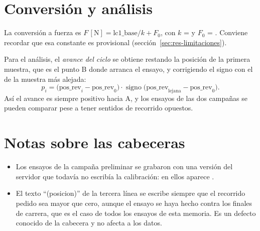 \section{Conversión y análisis}

La conversión a fuerza es $F\,[\si{\newton}] = \text{lc1\_base}/k + F_0$, con $k$ =
 y $F_0$ = . Conviene recordar que esa constante
es provisional (sección~\ref{sec:res-limitaciones}).

Para el análisis, el \emph{avance del ciclo} se obtiene restando la posición de la primera muestra,
que es el punto B donde arranca el ensayo, y corrigiendo el signo con el de la muestra más alejada:
\begin{equation}
  p_i = \big(\text{pos\_rev}_i - \text{pos\_rev}_0\big)\cdot\operatorname{signo}
        \big(\text{pos\_rev}_{\text{lejana}} - \text{pos\_rev}_0\big).
\end{equation}
Así el avance es siempre positivo hacia A, y los ensayos de las dos campañas se pueden comparar pese
a tener sentidos de recorrido opuestos.

\section{Notas sobre las cabeceras}

\begin{itemize}
  \item Los ensayos de la campaña preliminar se grabaron con una versión del servidor que todavía no
        escribía la calibración: en ellos aparece .
  \item El texto ``(posicion)'' de la tercera línea se escribe siempre que el recorrido pedido sea
        mayor que cero, aunque el ensayo se haya hecho contra los finales de carrera, que es el caso
        de todos los ensayos de esta memoria. Es un defecto conocido de la cabecera y no afecta a los
        datos.
\end{itemize}
